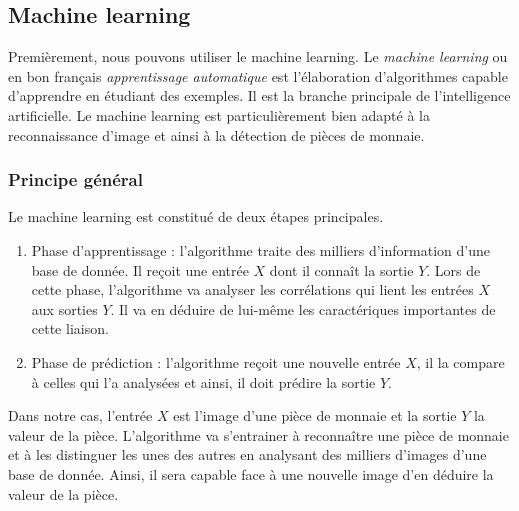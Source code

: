 \subsection{Machine learning}
Premièrement, nous pouvons utiliser le machine learning. Le \textit{machine learning} ou en bon français \textit{apprentissage automatique} est l'élaboration d'algorithmes capable d'apprendre en étudiant des exemples. Il est la branche principale de l'intelligence artificielle. Le machine learning est particulièrement bien adapté à la reconnaissance d'image et ainsi à la détection de pièces de monnaie. 
\subsubsection{Principe général}
Le machine learning est constitué de deux étapes principales.
\begin{enumerate}
\item Phase d'apprentissage : l'algorithme traite des milliers d'information d'une base de donnée. Il reçoit une entrée $X$ dont il connaît la sortie $Y$. Lors de cette phase, l'algorithme va analyser les corrélations qui lient les entrées $X$ aux sorties $Y$. Il va en déduire de lui-même les caractériques importantes de cette liaison.
\item Phase de prédiction : l'algorithme reçoit une nouvelle entrée $X$, il la compare à celles qui l'a analysées et ainsi, il doit prédire la sortie $Y$. 
\end{enumerate}
Dans notre cas, l'entrée $X$ est l'image d'une pièce de monnaie et la sortie $Y$ la valeur de la pièce. L'algorithme va s'entrainer à reconnaître une pièce de monnaie et à les distinguer les unes des autres en analysant des milliers d'images d'une base de donnée. Ainsi, il sera capable face à une nouvelle image d'en déduire la valeur de la pièce. 
